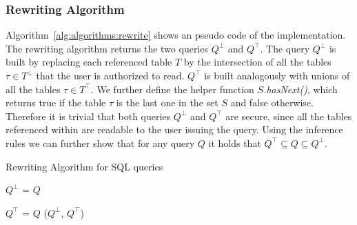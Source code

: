 \subsubsection{Rewriting Algorithm}
%
Algorithm~\ref{alg:algorithms:rewrite} shows an pseudo code of the implementation.
%
The rewriting algorithm returns the two queries $Q^\bot$ and $Q^\top$.
%
The query $Q^\bot$ is built by replacing each referenced table $T$ by the intersection of all the tables $\tau \in T^\bot$ that the user is authorized to read.
%
$Q^\top$ is built analogously with unions of all the tables $\tau \in T^\top$.
%
We further define the helper function \emph{$S$.hasNext()}, which returns true if the table $\tau$ is the last one in the set $S$ and false otherwise.
%
Therefore it is trivial that both queries $Q^\bot$ and $Q^\top$ are secure, since all the tables referenced within are readable to the user issuing the query.
%
Using the inference rules we can further show that for any query $Q$ it holds that $Q^\top \subseteq Q \subseteq Q^\bot$.
%
\begin{algorithm}
\caption{Rewriting Algorithm for SQL queries}
\label{alg:algorithms:rewrite}
	\SetAlgoLined
	$Q^\bot$ = $Q$\;
    
    $Q^\top$ = $Q$\;
     \Return ($Q^\bot$, $Q^\top$)\;
\end{algorithm}

